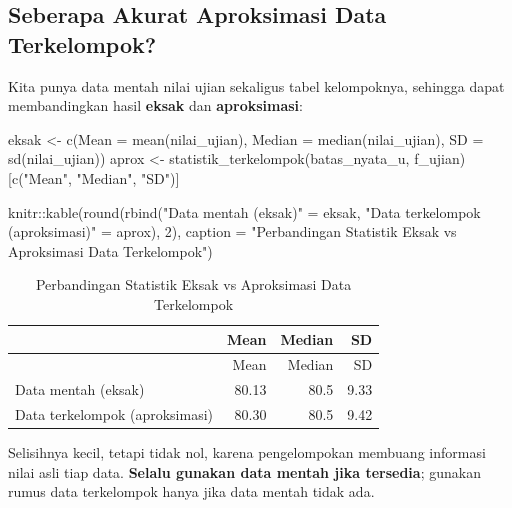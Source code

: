 \documentclass[
  indonesian,
  letterpaper,
]{book}
\newenvironment{Shaded}{\begin{snugshade}}{\end{snugshade}}
\newcommand{\AttributeTok}[1]{\textcolor[rgb]{0.40,0.45,0.13}{#1}}
\newcommand{\DecValTok}[1]{\textcolor[rgb]{0.68,0.00,0.00}{#1}}
\newcommand{\FunctionTok}[1]{\textcolor[rgb]{0.28,0.35,0.67}{#1}}
\newcommand{\NormalTok}[1]{\textcolor[rgb]{0.00,0.23,0.31}{#1}}
\newcommand{\OtherTok}[1]{\textcolor[rgb]{0.00,0.23,0.31}{#1}}
\newcommand{\SpecialCharTok}[1]{\textcolor[rgb]{0.37,0.37,0.37}{#1}}
\newcommand{\StringTok}[1]{\textcolor[rgb]{0.13,0.47,0.30}{#1}}
\begin{document}
\subsection{Seberapa Akurat Aproksimasi Data
Terkelompok?}\label{seberapa-akurat-aproksimasi-data-terkelompok}

Kita punya data mentah nilai ujian sekaligus tabel kelompoknya, sehingga
dapat membandingkan hasil \textbf{eksak} dan \textbf{aproksimasi}:

\begin{Shaded}
\begin{Highlighting}[]
\NormalTok{eksak }\OtherTok{\textless{}{-}} \FunctionTok{c}\NormalTok{(}\AttributeTok{Mean =} \FunctionTok{mean}\NormalTok{(nilai\_ujian), }\AttributeTok{Median =} \FunctionTok{median}\NormalTok{(nilai\_ujian), }\AttributeTok{SD =} \FunctionTok{sd}\NormalTok{(nilai\_ujian))}
\NormalTok{aprox }\OtherTok{\textless{}{-}} \FunctionTok{statistik\_terkelompok}\NormalTok{(batas\_nyata\_u, f\_ujian)[}\FunctionTok{c}\NormalTok{(}\StringTok{"Mean"}\NormalTok{, }\StringTok{"Median"}\NormalTok{, }\StringTok{"SD"}\NormalTok{)]}

\NormalTok{knitr}\SpecialCharTok{::}\FunctionTok{kable}\NormalTok{(}\FunctionTok{round}\NormalTok{(}\FunctionTok{rbind}\NormalTok{(}\StringTok{"Data mentah (eksak)"} \OtherTok{=}\NormalTok{ eksak, }\StringTok{"Data terkelompok (aproksimasi)"} \OtherTok{=}\NormalTok{ aprox), }\DecValTok{2}\NormalTok{),}
\AttributeTok{caption =} \StringTok{"Perbandingan Statistik Eksak vs Aproksimasi Data Terkelompok"}\NormalTok{)}
\end{Highlighting}
\end{Shaded}

\begin{longtable}[]{@{}lrrr@{}}
\caption{Perbandingan Statistik Eksak vs Aproksimasi Data
Terkelompok}\tabularnewline
\toprule\noalign{}
& Mean & Median & SD \\
\midrule\noalign{}
\endfirsthead
\toprule\noalign{}
& Mean & Median & SD \\
\midrule\noalign{}
\endhead
\bottomrule\noalign{}
\endlastfoot
Data mentah (eksak) & 80.13 & 80.5 & 9.33 \\
Data terkelompok (aproksimasi) & 80.30 & 80.5 & 9.42 \\
\end{longtable}

Selisihnya kecil, tetapi tidak nol, karena pengelompokan membuang
informasi nilai asli tiap data. \textbf{Selalu gunakan data mentah jika
tersedia}; gunakan rumus data terkelompok hanya jika data mentah tidak
ada.
\end{document}
